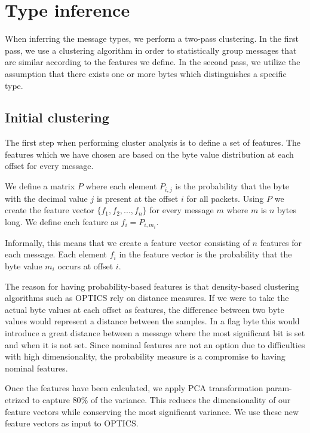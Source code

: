 \documentclass[a4paper]{report}
\begin{document}
\section{Type inference}
When inferring the message types, we perform a two-pass clustering. In the
first pass, we use a clustering algorithm in order to statistically group
messages that are similar according to the features we define. In the second
pass, we utilize the assumption that there exists one or more bytes which
distinguishes a specific type.

\subsection{Initial clustering}
\label{sec:init_clust}
The first step when performing cluster analysis is to define a set of features.
The features which we have chosen are based on the byte value distribution at
each offset for every message.

We define a matrix $P$ where each element $P_{i,j}$ is the probability that
the byte with the decimal value $j$ is present at the offset $i$ for all
packets. Using $P$ we create the feature vector $\{f_1, f_2, ..., f_n\}$ for
every message $m$ where $m$ is $n$ bytes long. We define each feature as
$f_i = P_{i, m_i}$.

Informally, this means that we create a feature vector consisting of $n$
features for each message. Each element $f_i$ in the feature vector is the
probability that the byte value $m_i$ occurs at offset $i$.

The reason for having probability-based features is that density-based
clustering algorithms such as OPTICS rely on distance measures. If we were to
take the actual byte values at each offset as features, the difference between
two byte values would represent a distance between the samples. In a flag byte
this would introduce a great distance between a message where the most
significant bit is set and when it is not set. Since nominal features are not
an option due to difficulties with high dimensionality, the probability
measure is a compromise to having nominal features.

Once the features have been calculated, we apply PCA transformation
param-etrized to capture $80\%$ of the variance. This reduces the
dimensionality of our feature vectors while conserving the most significant
variance. We use these new feature vectors as input to OPTICS.
\end{document}
